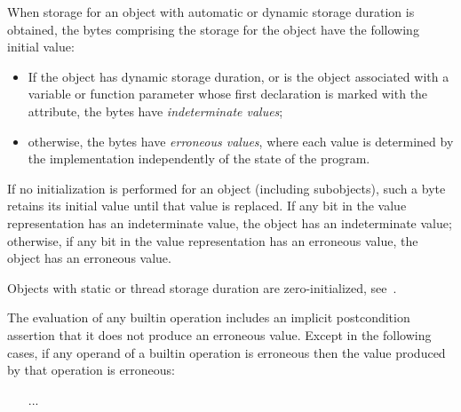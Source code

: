 \begin{adjustwidth}{0.5cm}{0.5cm}
When storage for an object with automatic or dynamic storage duration
is obtained,
the bytes comprising the storage for the object
have the following initial value:
\begin{itemize}
\item
If the object has dynamic storage duration, or
is the object associated with a variable or function parameter
whose first declaration is marked with
the \tcode{[[indeterminate]]} attribute,
the bytes have \emph{indeterminate values};
\item
otherwise, the bytes have \emph{erroneous values},
where each value is determined by the implementation
independently of the state of the program.
\end{itemize}
If no initialization is performed for an object (including subobjects),
such a byte retains its initial value
until that value is replaced.
If any bit in the value representation has an indeterminate value,
the object has an indeterminate value;
otherwise, if any bit in the value representation has an erroneous value,
the object has an erroneous value.
\begin{note}
Objects with static or thread storage duration are zero-initialized,
see~.
\end{note}


\begin{addedblock}
The evaluation of any builtin operation includes an implicit postcondition assertion
that it does not produce an erroneous value.  Except in the following cases,
if any operand of a builtin operation is erroneous then the value
produced by that operation is erroneous:
\begin{itemize}
\item [...]
\end{itemize}
\end{addedblock}


\end{adjustwidth}

